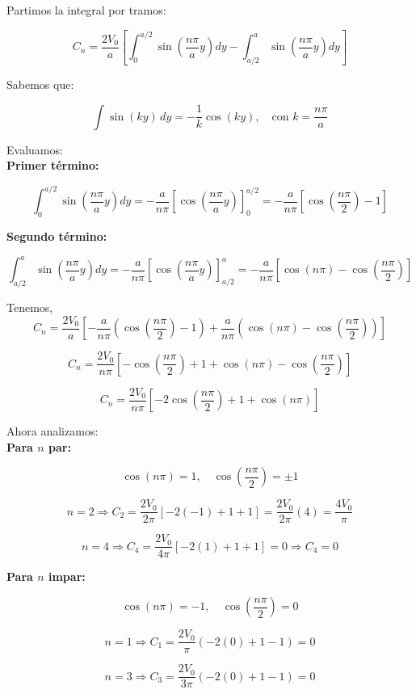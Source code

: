\documentclass[12pt]{article}
\begin{document}
Partimos la integral por tramos:

\[
C_n = \frac{2V_0}{a} \left[ \int_0^{a/2} \sin\left( \frac{n\pi}{a} y \right) dy - \int_{a/2}^{a} \sin\left( \frac{n\pi}{a} y \right) dy \right]
\]

Sabemos que:

\[
\int \sin(ky) \, dy = -\frac{1}{k} \cos(ky), \quad \text{con } k = \frac{n\pi}{a}
\]

Evaluamos:\\

\textbf{Primer término:}

\[
\int_0^{a/2} \sin\left( \frac{n\pi}{a} y \right) dy = -\frac{a}{n\pi} \left[ \cos\left( \frac{n\pi}{a} y \right) \right]_0^{a/2}
= -\frac{a}{n\pi} \left[ \cos\left( \frac{n\pi}{2} \right) - 1 \right]
\]

\textbf{Segundo término:}

\[
\int_{a/2}^{a} \sin\left( \frac{n\pi}{a} y \right) dy = -\frac{a}{n\pi} \left[ \cos\left( \frac{n\pi}{a} y \right) \right]_{a/2}^{a}
= -\frac{a}{n\pi} \left[ \cos(n\pi) - \cos\left( \frac{n\pi}{2} \right) \right]
\]

Tenemos,
\[
C_n = \frac{2V_0}{a} \left[ -\frac{a}{n\pi} (\cos\left( \frac{n\pi}{2} \right) - 1) + \frac{a}{n\pi} (\cos(n\pi) - \cos\left( \frac{n\pi}{2} \right)) \right]
\]

\[
C_n = \frac{2V_0}{n\pi} \left[ -\cos\left( \frac{n\pi}{2} \right) + 1 + \cos(n\pi) - \cos\left( \frac{n\pi}{2} \right) \right]
\]

\[
C_n = \frac{2V_0}{n\pi} \left[ -2\cos\left( \frac{n\pi}{2} \right) + 1 + \cos(n\pi) \right]
\]

Ahora analizamos:\\

\textbf{Para \( n \) par:}

\[
\cos(n\pi) = 1, \quad \cos\left( \frac{n\pi}{2} \right) = \pm 1
\]

\[
n = 2 \Rightarrow C_2 = \frac{2V_0}{2\pi} \left[ -2(-1) + 1 + 1 \right] = \frac{2V_0}{2\pi}(4) = \frac{4V_0}{\pi}
\]

\[
n = 4 \Rightarrow C_4 = \frac{2V_0}{4\pi} \left[ -2(1) + 1 + 1 \right] = 0 \Rightarrow C_4 = 0
\]

\textbf{Para \( n \) impar:}

\[
\cos(n\pi) = -1, \quad \cos\left( \frac{n\pi}{2} \right) = 0
\]

\[
n = 1 \Rightarrow C_1 = \frac{2V_0}{\pi} (-2(0) + 1 - 1) = 0
\]

\[
n = 3 \Rightarrow C_3 = \frac{2V_0}{3\pi} (-2(0) + 1 - 1) = 0
\]
\end{document}
